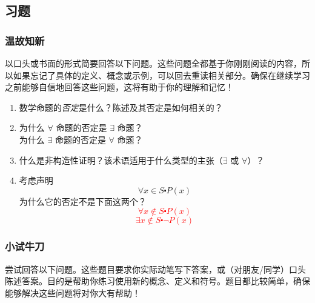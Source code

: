 \subsection{习题}

\subsubsection*{温故知新}

以口头或书面的形式简要回答以下问题。这些问题全都基于你刚刚阅读的内容，所以如果忘记了具体的定义、概念或示例，可以回去重读相关部分。确保在继续学习之前能够自信地回答这些问题，这将有助于你的理解和记忆！

\begin{enumerate}[label=(\arabic*)]
    \item 数学命题的\emph{否定}是什么？陈述及其否定是如何相关的？
    \item 为什么 $\forall$ 命题的否定是 $\exists$ 命题？\\
        为什么 $\exists$ 命题的否定是 $\forall$ 命题？
    \item 什么是非构造性证明？该术语适用于什么类型的主张（$\exists$ 或 $\forall$）？
    \item 考虑声明
        \[\forall x \in S \centerdot P(x)\]
        为什么它的否定不是下面这两个？
        \textcolor{red}{
            \[\forall x \notin S \centerdot P(x)\]
            \[\exists x \notin S \centerdot \neg P(x)\]
        }
\end{enumerate}

\subsubsection*{小试牛刀}

尝试回答以下问题。这些题目要求你实际动笔写下答案，或（对朋友/同学）口头陈述答案。目的是帮助你练习使用新的概念、定义和符号。题目都比较简单，确保能够解决这些问题将对你大有帮助！

